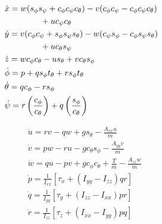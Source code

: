 \begin{minipage}{0.5\textwidth}
    \begin{equation*}
        \begin{aligned}
            &\dot{{x}} = {w}({s_{\phi}s_{\psi}} + {c_{\phi}c_{\psi}c_{\theta}}) - {v}({c_{\phi}c_{\psi}} - {c_{\phi}c_{\psi}c_{\theta}}) \\
            &\hspace{1.5cm} + {uc_{\psi}c_{\theta}}\\
            &\dot{{y}} = {v}({c_{\phi}c_{\psi}} + {s_{\phi}s_{\psi}s_{\theta}}) - {w}({c_{\psi}s_{\phi}} - {c_{\phi}s_{\psi}s_{\theta}}) \\
            &\hspace{1.5cm} + {uc_{\theta}s_{\psi}}\\
            &\dot{{z}} = {wc_{\phi}c_{\theta}} - {us_{\theta}} + {vc_{\theta}s_{\phi}}\\
            &\dot{{\phi}} = {p} + {qs_{\phi}t_{\theta}} + {rs_{\phi}t_{\theta}}\\
            &\dot{{\theta}} = {qc_{\phi}} - {rs_{\phi}}\\
            &\dot{{\psi}} = {r\left(\frac{c_{\phi}}{c_{\theta}}\right)} + {q\left(\frac{s_{\phi}}{c_{\theta}}\right)}
        \end{aligned}
    \end{equation*}
\end{minipage}
\hfill
\begin{minipage}{0.45\textwidth}
    \begin{equation*}
        \begin{aligned}
            &\dot{{u}} = {rv} - {qw} + {gs_{\theta}} - \frac{{A_{xx}}{u}}{{m}}\\
            &\dot{{v}} = {pw} - {ru} - {gc_{\theta}s_{\phi}} - \frac{{A_{yy}}{v}}{{m}}\\
            &\dot{{w}} = {qu} - {pv} + {gc_{\phi}c_{\theta}} + {\frac{T}{m}} - \frac{{A_{zz}}{w}}{{m}}\\
            &\dot{{p}} = {\frac{1}{I_{xx}}\left[{\tau_x + (I_{yy} - I_{zz})qr}\right]}\\
            &\dot{{q}} = {\frac{1}{I_{yy}}\left[{\tau_y + (I_{zz} - I_{xx})pr}\right]}\\
            &\dot{{r}} = {\frac{1}{I_{zz}}\left[{\tau_z + (I_{xx} - I_{yy})pq}\right]}
        \end{aligned}
    \end{equation*}
\end{minipage}

